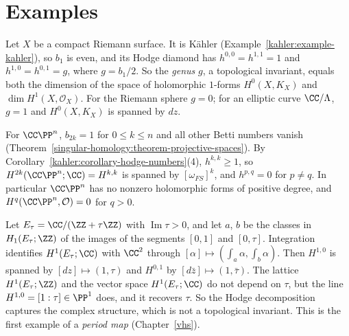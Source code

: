 \section{Examples}\label{kahler:section-examples-hodge-decomposition}

\begin{example}\label{kahler:example-curves}
Let $X$ be a compact Riemann surface. It is K\"ahler (Example~\ref{kahler:example-kahler}), so $b_1$ is even, and its Hodge diamond has $h^{0,0} = h^{1,1} = 1$ and
$h^{1,0} = h^{0,1} = g$, where $g = b_1/2$. So the \emph{genus} $g$, a topological invariant, equals both the dimension of the space of
holomorphic $1$-forms $H^0(X, K_X)$ and $\dim H^1(X, \mathcal{O}_X)$. For the Riemann sphere $g = 0$; for an elliptic curve
$\CC/\Lambda$, $g = 1$ and $H^0(X, K_X)$ is spanned by $dz$.
\end{example}

\begin{example}\label{kahler:example-projective-space}
For $\CC\PP^n$, $b_{2k} = 1$ for $0 \leq k \leq n$ and all other Betti numbers vanish
(Theorem~\ref{singular-homology:theorem-projective-spaces}). By Corollary~\ref{kahler:corollary-hodge-numbers}(4),
$h^{k,k} \geq 1$, so $H^{2k}(\CC\PP^n; \CC) = H^{k,k}$ is spanned by $[\omega_{FS}]^k$, and $h^{p,q} = 0$ for $p \neq q$. In particular
$\CC\PP^n$ has no nonzero holomorphic forms of positive degree, and $H^q(\CC\PP^n, \mathcal{O}) = 0$ for $q > 0$.
\end{example}

\begin{example}\label{kahler:example-elliptic-periods}
Let $E_\tau = \CC/(\ZZ + \tau\ZZ)$ with $\operatorname{Im}\tau > 0$, and let $a$, $b$ be the classes in $H_1(E_\tau; \ZZ)$ of the images of
the segments $[0, 1]$ and $[0, \tau]$. Integration identifies $H^1(E_\tau; \CC)$ with $\CC^2$ through
$[\alpha] \mapsto (\int_a\alpha, \int_b\alpha)$. Then $H^{1,0}$ is spanned by $[dz] \mapsto (1, \tau)$ and $H^{0,1}$ by
$[d\bar z] \mapsto (1, \bar\tau)$. The lattice $H^1(E_\tau; \ZZ)$ and the vector space $H^1(E_\tau; \CC)$ do not depend on $\tau$, but the
line $H^{1,0} = [1 : \tau] \in \PP^1$ does, and it recovers $\tau$. So the Hodge decomposition captures the complex structure, which is not a
topological invariant. This is the first example of a \emph{period map} (Chapter~\ref{vhs}).
\end{example}

